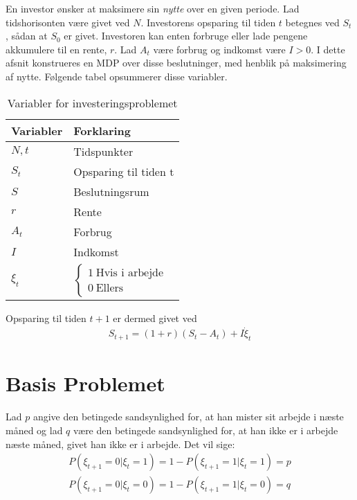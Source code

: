 En investor ønsker at maksimere sin \textit{nytte} over en given periode.
Lad tidshorisonten være givet ved $N$. Investorens opsparing til tiden $t$ betegnes ved $S_t$, sådan at $S_0$ er givet. Investoren kan enten forbruge eller lade pengene akkumulere til en rente, $r$. Lad $A_t$ være forbrug og indkomst være $I>0$. I dette afsnit konstrueres en MDP over disse beslutninger, med henblik på maksimering af nytte. Følgende tabel opsummerer disse variabler.


\begin{table}[!hbt]
\caption{Variabler for investeringsproblemet}
\begin{tabular}{@{}l|l@{}}
\toprule
Variabler & Forklaring                     \\ \midrule
$N,t$       & Tidspunkter                  \\
$S_t$       & Opsparing til tiden t        \\
$S$         & Beslutningsrum               \\
$r$         & Rente                        \\
$A_t$       & Forbrug                      \\
$I$         & Indkomst                     \\
$\xi_t$     & $\begin{cases}1\ \text{Hvis i arbejde}\\0\ \text{Ellers}\end{cases}$ \\ \bottomrule
\end{tabular}
\end{table}




Opsparing til tiden $t+1$ er dermed givet ved
\begin{align*}
    S_{t+1}=(1+r)(S_t-A_t)+I\dot \xi_t
\end{align*}


\section{Basis Problemet}
Lad $p$ angive den betingede sandsynlighed for, at han mister sit arbejde i næste måned og lad $q$ være den betingede sandsynlighed for, at han ikke er i arbejde næste måned, givet han ikke er i arbejde. 
Det vil sige:
\begin{align*}
    P(\xi_{t+1}=0|\xi_t=1)=1-P(\xi_{t+1}=1|\xi_t=1)=p\\
    P(\xi_{t+1}=0|\xi_t=0)=1-P(\xi_{t+1}=1|\xi_t=0)=q
\end{align*}



